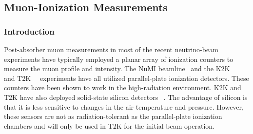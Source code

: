 %
%


%
%
\subsection{Muon-Ionization Measurements}
\label{sec:detectors-nd-blm-muon-ionization}

\subsubsection{Introduction}

Post-absorber muon measurements in most of the recent neutrino-beam
experiments have typically employed a planar array of ionization
counters to measure the muon profile and intensity. The 
NuMI beamline~\cite{ref:NuMIBeamMonitors} and the K2K~\cite{ref:K2K}~\cite{ref:Maruyama}
and T2K~\cite{ref:T2KMuIon}~\cite{ref:T2KMuMon} experiments have all
utilized parallel-plate ionization detectors. These counters have been
shown to work in the high-radiation environment. 
K2K and T2K have also deployed solid-state silicon detectors~\cite{ref:Maruyama}
\cite{ref:RD42A}. The advantage of silicon is that it is less
sensitive to changes in the air temperature and pressure. However, these %
sensors are not as radiation-tolerant as the parallel-plate ionization 
chambers and will only be used in T2K for the initial
beam operation. 

